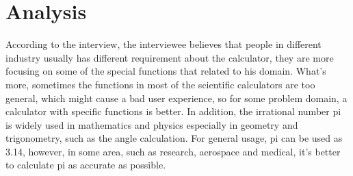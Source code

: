 \documentclass[12pt,letterpaper]{article}
\begin{document}
\section*{Analysis}
According to the interview, the interviewee believes that people in different industry usually has different requirement about the calculator, they are more focusing on some of the special functions that related to his domain. What's more, sometimes the functions in most of the scientific calculators are too general, which might cause a bad user experience, so for some problem domain, a calculator with specific functions is better. In addition, the irrational number pi is widely used in mathematics and physics especially in geometry and trigonometry, such as the angle calculation. For general usage, pi can be used as 3.14, however, in some area, such as research, aerospace and medical, it's better to calculate pi as accurate as possible.
\end{document}
